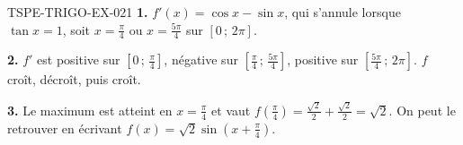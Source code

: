 \begin{corrige}{TSPE-TRIGO-EX-021}
\textbf{1.} $f'(x)=\cos x-\sin x$, qui s'annule lorsque $\tan x=1$, soit
$x=\tfrac{\pi}{4}$ ou $x=\tfrac{5\pi}{4}$ sur $[0\,;\,2\pi]$.

\textbf{2.} $f'$ est positive sur $\left[0\,;\,\tfrac{\pi}{4}\right]$,
négative sur $\left[\tfrac{\pi}{4}\,;\,\tfrac{5\pi}{4}\right]$, positive sur
$\left[\tfrac{5\pi}{4}\,;\,2\pi\right]$. $f$ croît, décroît, puis croît.

\textbf{3.} Le maximum est atteint en $x=\tfrac{\pi}{4}$ et vaut
$f\left(\tfrac{\pi}{4}\right)=\tfrac{\sqrt2}{2}+\tfrac{\sqrt2}{2}=\sqrt2$.
On peut le retrouver en écrivant
$f(x)=\sqrt2\sin\left(x+\tfrac{\pi}{4}\right)$.
\end{corrige}
